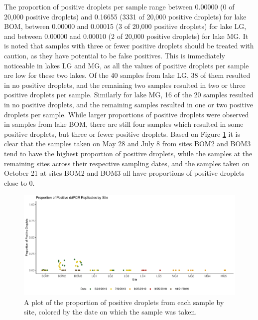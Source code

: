\documentclass[12pt]{article}\usepackage[]{graphicx}\usepackage[]{color}
\makeatletter
\def\maxwidth{ %
  \ifdim\Gin@nat@width>\linewidth
    \linewidth
  \else
    \Gin@nat@width
  \fi
}
\newenvironment{knitrout}{}{} %
\def\maxwidth{ %
  \ifdim\Gin@nat@width>\linewidth
    \linewidth
  \else
    \Gin@nat@width
  \fi
}
\newenvironment{knitrout}{}{} %
\makeatother
\begin{document}
The proportion of positive droplets per sample range between 0.00000 (0 of 20,000 positive droplets) and 0.16655 (3331 of 20,000 positive droplets) for lake BOM, between 0.00000 and 0.00015 (3 of 20,000 positive droplets) for lake LG, and between 0.00000 and 0.00010 (2 of 20,000 positive droplets) for lake MG. It is noted that samples with three or fewer positive droplets should be treated with caution, as they have potential to be false positives. This is immediately noticeable in lakes LG and MG, as all the values of positive droplets per sample are low for these two lakes. Of the 40 samples from lake LG, 38 of them resulted in no positive droplets, and the remaining two samples resulted in two or three positive droplets per sample. Similarly for lake MG, 16 of the 20 samples resulted in no positive droplets, and the remaining samples resulted in one or two positive droplets per sample. While larger proportions of positive droplets were observed in samples from lake BOM, there are still four samples which resulted in some positive droplets, but three or fewer positive droplets. Based on Figure \ref{fig:eDNA_droplets} it is clear that the samples taken on May 28 and July 8 from sites BOM2 and BOM3 tend to have the highest proportion of positive droplets, while the samples at the remaining sites across their respective sampling dates, and the samples taken on October 21 at sites BOM2 and BOM3 all have proportions of positive droplets close to 0. 

\begin{figure}[]
\begin{knitrout}
\color{fgcolor}

{\centering \includegraphics[width=\maxwidth]{figure/eDNA_visualization_droplets-1} 

}



\end{knitrout}
\caption{A plot of the proportion of positive droplets from each sample by site, colored by the date on which the sample was taken.}
\label{fig:eDNA_droplets}
\end{figure}
\end{document}
